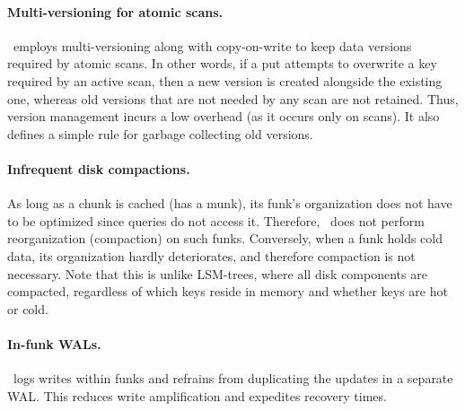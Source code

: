 \paragraph{Multi-versioning for atomic scans.} \sys\ employs multi-versioning along with
copy-on-write to keep data versions required by atomic scans. 
In other words, if a put attempts to overwrite a key  required by an active scan, then a new version is created alongside the 
existing one, whereas old versions that are not needed by any scan are not retained. 
Thus, version management incurs a low overhead (as it occurs only on scans). It also defines a simple rule for garbage collecting old versions.
\paragraph{Infrequent disk compactions.} 
As long as a chunk is cached (has a munk), its funk's organization does not have to be optimized since 
queries do not access it. Therefore, \sys\ does not perform reorganization (compaction) on such funks.
Conversely, when a funk holds cold data, its organization hardly deteriorates, and therefore compaction is not necessary.
Note that this is unlike LSM-trees, where all disk components are compacted, regardless of which keys reside in memory and whether 
keys are hot or cold. 

\paragraph{In-funk WALs.} \sys\ logs writes within funks and refrains from duplicating the updates  in a separate WAL. This reduces write amplification and expedites recovery times. 
